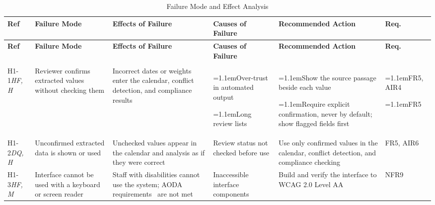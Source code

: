 \documentclass{article}
\newcommand{\haz}[1]{\leavevmode\phantomsection\label{haz:#1}#1}
\begin{document}
\newcommand{\fmi}[2]{\hangindent=1.1em\hangafter=1\noindent\makebox[1.1em][l]{#1.}#2}

{\small
\renewcommand{\arraystretch}{1.2}
\setlength{\tabcolsep}{4pt}
\begin{longtable}{>{\raggedright\arraybackslash}p{1.2cm}
  >{\raggedright\arraybackslash}p{2.4cm}
  >{\raggedright\arraybackslash}p{2.7cm}
  >{\raggedright\arraybackslash}p{2.6cm}
  >{\raggedright\arraybackslash}p{3.9cm}
  >{\raggedright\arraybackslash}p{2.0cm}}
\toprule
\textbf{Ref} & \textbf{Failure Mode} & \textbf{Effects of Failure} &
  \textbf{Causes of Failure} & \textbf{Recommended Action} & \textbf{Req.}\\
\midrule
\endfirsthead
\toprule
\textbf{Ref} & \textbf{Failure Mode} & \textbf{Effects of Failure} &
  \textbf{Causes of Failure} & \textbf{Recommended Action} & \textbf{Req.}\\
\midrule
\endhead
\endfoot
\bottomrule
\caption{Failure Mode and Effect Analysis} \label{TblFMEA}
\endlastfoot
\multicolumn{6}{l}{\textbf{C1: User Interface}}\\*
\midrule
\haz{H1-1}\newline \textit{HF, H} & Reviewer confirms extracted values without checking them & Incorrect dates or weights enter the calendar, conflict detection, and compliance results & \fmi{a}{Over-trust in automated output}\par \fmi{b}{Long review lists} & \fmi{a}{Show the source passage beside each value}\par \fmi{b}{Require explicit confirmation, never by default; show flagged fields first} & \fmi{a}{FR5, AIR4}\par \fmi{b}{FR5}\\
\addlinespace
\haz{H1-2}\newline \textit{DQ, H} & Unconfirmed extracted data is shown or used & Unchecked values appear in the calendar and analysis as if they were correct & Review status not checked before use & Use only confirmed values in the calendar, conflict detection, and compliance checking & FR5, AIR6\\
\addlinespace
\haz{H1-3}\newline \textit{HF, M} & Interface cannot be used with a keyboard or screen reader & Staff with disabilities cannot use the system; AODA requirements~\citep{AODA2005, IASR2011} are not met & Inaccessible interface components & Build and verify the interface to WCAG 2.0 Level AA~\citep{WCAG20} & NFR9\\

\end{longtable}}
\end{document}
